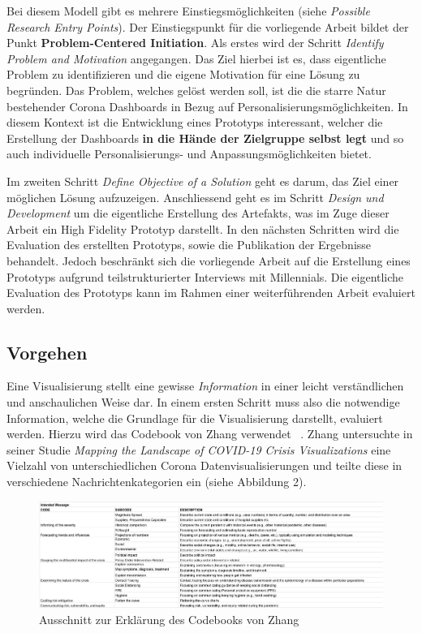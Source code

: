 \documentclass[12pt, oneside]{article}
\begin{document}
Bei diesem Modell gibt es mehrere Einstiegsmöglichkeiten (siehe \textit{Possible Research Entry Points}). Der Einstiegspunkt für die vorliegende Arbeit bildet der Punkt \textbf{Problem-Centered Initiation}. Als erstes wird der Schritt \textit{Identify Problem and Motivation} angegangen. Das Ziel hierbei ist es, dass eigentliche Problem zu identifizieren und die eigene Motivation für eine Lösung zu begründen. Das Problem, welches gelöst werden soll, ist die die starre Natur bestehender Corona Dashboards in Bezug auf Personalisierungsmöglichkeiten. In diesem Kontext ist die Entwicklung eines Prototyps interessant, welcher die Erstellung der Dashboards \textbf{in die Hände der Zielgruppe selbst legt} und so auch individuelle Personalisierungs- und Anpassungsmöglichkeiten bietet.

Im zweiten Schritt \textit{Define Objective of a Solution} geht es darum, das Ziel einer möglichen Lösung aufzuzeigen. Anschliessend geht es im Schritt \textit{Design und Development} um die eigentliche Erstellung des Artefakts, was im Zuge dieser Arbeit ein High Fidelity Prototyp darstellt. In den nächsten Schritten wird die Evaluation des erstellten Prototyps, sowie die Publikation der Ergebnisse behandelt. Jedoch beschränkt sich die vorliegende Arbeit auf die Erstellung eines Prototyps aufgrund teilstrukturierter Interviews mit Millennials. Die eigentliche Evaluation des Prototyps kann im Rahmen einer weiterführenden Arbeit evaluiert werden.

\clearpage
\subsection{Vorgehen}
Eine Visualisierung stellt eine gewisse \textit{Information} in einer leicht verständlichen und anschaulichen Weise dar. In einem ersten Schritt muss also die notwendige Information, welche die Grundlage für die Visualisierung darstellt, evaluiert werden. Hierzu wird das Codebook von Zhang verwendet ~\citep{YixuanZhang.2021}. Zhang untersuchte in seiner Studie \textit{Mapping the Landscape of COVID-19 Crisis Visualizations} eine Vielzahl von unterschiedlichen Corona Datenvisualisierungen und teilte diese in verschiedene Nachrichtenkategorien ein (siehe Abbildung 2).

\begin{figure}[ht]
	\includegraphics[width=14cm]{images/message_categories_zhang.png}
	\centering
	\caption{Ausschnitt zur Erklärung des Codebooks von Zhang ~\citep{YixuanZhang.2021}}
\end{figure}
\end{document}
